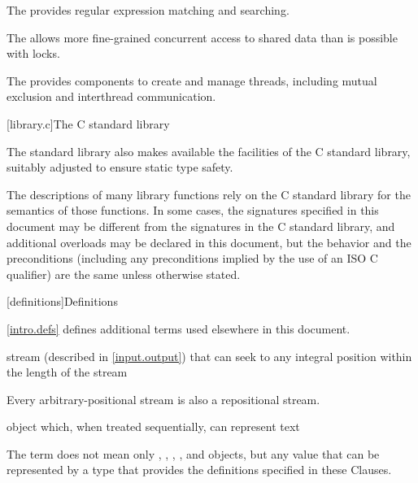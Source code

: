 \pnum
The  provides regular expression matching and searching.

\pnum
The  allows more fine-grained
concurrent access to shared data than is possible with locks.

\pnum
The  provides components to create
and manage threads, including mutual exclusion and interthread communication.

[library.c]{The C standard library}

\pnum
The \Cpp{} standard library also makes available the facilities of the C standard library,
%
suitably adjusted to ensure static type safety.

\pnum
The descriptions of many library functions rely on the C standard library for
the semantics of those functions.
In some cases,
the signatures specified in this document
may be different from the signatures in the C standard library,
and additional overloads may be declared in this document,
but the behavior and the preconditions
(including any preconditions implied by the use of an
ISO C  qualifier)
are the same unless otherwise stated.

[definitions]{Definitions}

\pnum
\begin{note}
\ref{intro.defs} defines additional terms used elsewhere in this document.
\end{note}

%
stream (described in \ref{input.output}) that can seek to any integral position within
the length of the stream

\begin{defnote}
Every arbitrary-positional stream is also a repositional stream.
\end{defnote}

%
object which,
when treated sequentially,
can represent text

\begin{defnote}
The term does not mean only
,
,
,
,
and
objects,
but any value that can be represented by a type
that provides the definitions specified in these Clauses.
\end{defnote}

